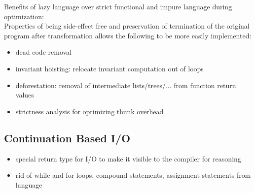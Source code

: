 \documentclass[8pt]{extarticle}
\begin{document}
\begin{multicols*}{2}
  Benefits of lazy language over strict functional and impure language during optimization:\\
  Properties of being side-effect free and preservation of termination of the original program after transformation allows the following to be more easily implemented:
  \begin{itemize}
  \item dead code removal
  \item invariant hoisting: relocate invariant computation out of loops
  \item deforestation: removal of intermediate lists/trees/... from function return values
  \item strictness analysis for optimizing thunk overhead
  \end{itemize}

  \subsection{Continuation Based I/O}
  \begin{itemize}
  \item special return type for I/O to make it visible to the compiler for reasoning
  \item rid of while and for loops, compound statements, assignment statements from language
  \end{itemize}


\end{multicols*}
\end{document}
